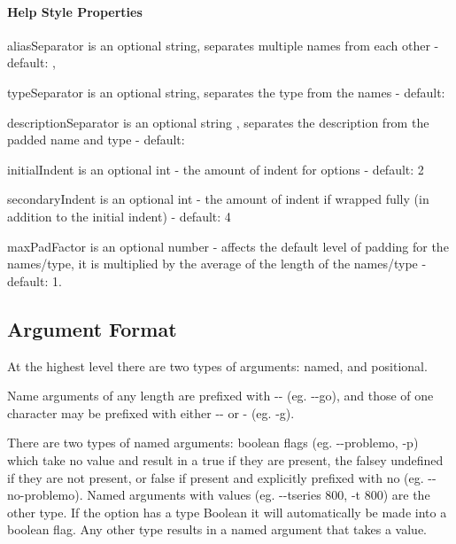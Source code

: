 \paragraph*{Help Style Properties}


\begin{DoxyItemize}
\item {\ttfamily alias\+Separator} is an optional string, separates multiple names from each other -\/ default\+: \textquotesingle{} ,\textquotesingle{}
\item {\ttfamily type\+Separator} is an optional string, separates the type from the names -\/ default\+: \textquotesingle{} \textquotesingle{}
\item {\ttfamily description\+Separator} is an optional string , separates the description from the padded name and type -\/ default\+: \textquotesingle{} \textquotesingle{}
\item {\ttfamily initial\+Indent} is an optional int -\/ the amount of indent for options -\/ default\+: 2
\item {\ttfamily secondary\+Indent} is an optional int -\/ the amount of indent if wrapped fully (in addition to the initial indent) -\/ default\+: 4
\item {\ttfamily max\+Pad\+Factor} is an optional number -\/ affects the default level of padding for the names/type, it is multiplied by the average of the length of the names/type -\/ default\+: 1.
\end{DoxyItemize}

\subsection*{Argument Format}

At the highest level there are two types of arguments\+: named, and positional.

Name arguments of any length are prefixed with {\ttfamily -\/-\/} (eg. {\ttfamily -\/-\/go}), and those of one character may be prefixed with either {\ttfamily -\/-\/} or {\ttfamily -\/} (eg. {\ttfamily -\/g}).

There are two types of named arguments\+: boolean flags (eg. {\ttfamily -\/-\/problemo}, {\ttfamily -\/p}) which take no value and result in a {\ttfamily true} if they are present, the falsey {\ttfamily undefined} if they are not present, or {\ttfamily false} if present and explicitly prefixed with {\ttfamily no} (eg. {\ttfamily -\/-\/no-\/problemo}). Named arguments with values (eg. {\ttfamily -\/-\/tseries 800}, {\ttfamily -\/t 800}) are the other type. If the option has a type {\ttfamily Boolean} it will automatically be made into a boolean flag. Any other type results in a named argument that takes a value.

